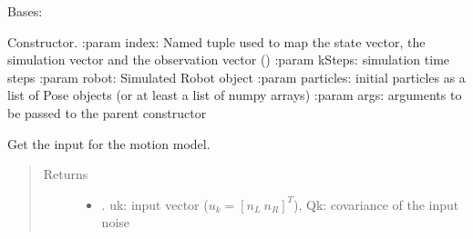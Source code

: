 \documentclass[letterpaper,10pt,english]{sphinxmanual}
\begin{document}
\begin{fulllineitems}
\label{\detokenize{particle_filter:PF_3DOF_MBL.PF_3DOF_MBL}}
\sphinxAtStartPar
Bases: {\hyperref[\detokenize{particle_filter:PFMBLocalization.PFMBL}]{}}

\begin{fulllineitems}
\label{\detokenize{particle_filter:PF_3DOF_MBL.PF_3DOF_MBL.__init__}}
\sphinxAtStartPar
Constructor.
:param index: Named tuple used to map the state vector, the simulation vector and the observation vector ()
:param kSteps: simulation time steps
:param robot: Simulated Robot object
:param particles: initial particles as a list of Pose objects (or at least a list of numpy arrays)
:param args: arguments to be passed to the parent constructor

\end{fulllineitems}


\begin{fulllineitems}
\label{\detokenize{particle_filter:PF_3DOF_MBL.PF_3DOF_MBL.GetInput}}
\sphinxAtStartPar
Get the input for the motion model.
\begin{quote}\begin{description}
\item[{Returns}] \leavevmode
\sphinxAtStartPar
\begin{itemize}
\item {} 
\sphinxAtStartPar
{}. uk: input vector (\(u_k=[n_L~n_R]^T\)), Qk: covariance of the input noise

\end{itemize}


\end{description}\end{quote}


\end{fulllineitems}
\end{fulllineitems}
\end{document}
